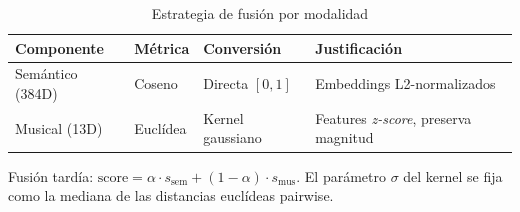 \begin{table}[htbp]
  \centering
  \caption{Estrategia de fusión por modalidad}
  \label{tab:recommendation_fusion_strategy}
  \begin{tabular}{llll}
    \toprule
    Componente & Métrica & Conversión & Justificación \\
    \midrule
    Semántico (384D) & Coseno & Directa $[0, 1]$ & Embeddings L2-normalizados \\
    Musical (13D) & Euclídea & Kernel gaussiano & Features \textit{z-score}, preserva magnitud \\
    \bottomrule
  \end{tabular}
  \begin{tablenotes}[flushleft]
    \small
    \item Fusión tardía: $\text{score} = \alpha \cdot s_{\text{sem}} + (1 - \alpha) \cdot s_{\text{mus}}$. El parámetro $\sigma$ del kernel se fija como la mediana de las distancias euclídeas pairwise.
  \end{tablenotes}
\end{table}